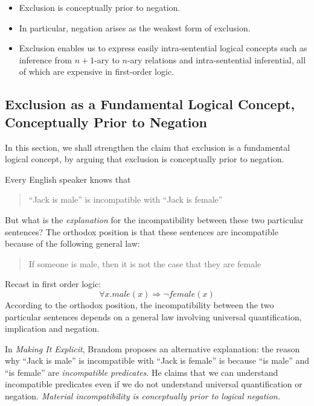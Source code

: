 \begin{itemize}

\item Exclusion is conceptually prior to negation.

\item In particular, negation arises as the weakest form of exclusion.

\item Exclusion enables us to express easily intra-sentential logical
  concepts such as inference from $n+1$-ary to $n$-ary relations and
  intra-sentential inferential, all of which are expensive in
  first-order logic.

\end{itemize}


\subsection{Exclusion as a Fundamental Logical Concept, Conceptually Prior to Negation}
In this section, we shall strengthen the claim that exclusion is a
fundamental logical concept, by arguing that exclusion is conceptually
prior to negation.

Every English speaker knows that
\begin{quote}
``Jack is male'' is incompatible with ``Jack is female''
\end{quote}
But what is the \emph{explanation} for the incompatibility between these two particular sentences? 
The orthodox position is that these sentences are incompatible because of the following general law:
\begin{quote}
If someone is male, then it is not the case that they are female
\end{quote}
Recast in first order logic:
\[
\forall x. male(x) \Rightarrow \neg female(x)
\]
According to the orthodox position, the incompatibility between the two particular sentences depends on a general law involving universal quantification, implication and negation. 

In \emph{Making It Explicit}\cite{brandom2}, Brandom proposes an alternative explanation:
the reason why ``Jack is male'' is incompatible with ``Jack is female'' is because ``is male'' and ``is female'' are \emph{incompatible predicates}.
He claims that we can understand incompatible predicates even if we do not understand universal quantification or negation.  \emph{Material incompatibility is
conceptually prior to logical negation.}

